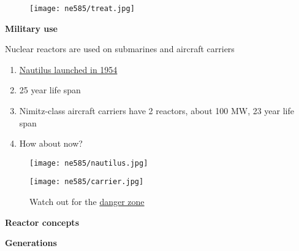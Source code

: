 \documentclass[aspectratio=1610,pdftex,dvipsnames,compress,xcolor={dvipsnames}]{beamer}
\begin{document}
\begin{frame}{}
    \begin{figure}
        \centering
        \texttt{[image: ne585/treat.jpg]}
    \end{figure}
\end{frame}


\begin{frame}[plain]{}
    \centering\LARGE\textbf{Military use}
\end{frame}


\addtocounter{framenumber}{-1} 
\begin{frame}{Nuclear reactors are used on submarines and aircraft carriers}
    \begin{enumerate}[series=outerlist,topsep=0pt,itemsep=21pt,leftmargin=*,label=(\arabic*)]
        \item[]\href{https://www.independent.co.uk/life-style/history/a-day-that-shook-the-world-first-nuclear-submarine-launched-2189571.html}{Nautilus launched in 1954}
        \item[]25 year life span
        \item[]Nimitz-class aircraft carriers have 2 reactors, about 100 MW, 23 year life span
        \item[]How about now?
    \end{enumerate}
\end{frame}


\begin{frame}{}
    \begin{figure}
        \centering
        \texttt{[image: ne585/nautilus.jpg]}
    \end{figure}
\end{frame}


\begin{frame}{}
    \begin{figure}
        \centering
        \texttt{[image: ne585/carrier.jpg]}
        \caption*{Watch out for the \href{https://youtu.be/siwpn14IE7E}{danger zone}}
    \end{figure}
\end{frame}


\begin{frame}[plain]{}
    \centering\LARGE\textbf{Reactor concepts}
\end{frame}


\begin{frame}[plain]{}
    \centering\LARGE\textbf{Generations}
\end{frame}
\end{document}
